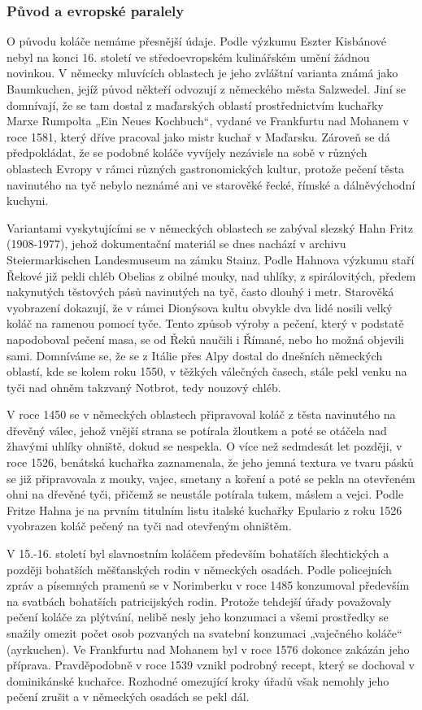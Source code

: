 \subsubsection{Původ a evropské
paralely}\label{250319-1326}

O původu koláče nemáme přesnější údaje. Podle výzkumu Eszter Kisbánové
nebyl na konci 16. století ve středoevropském kulinářském umění žádnou
novinkou. V německy mluvících oblastech je jeho zvláštní varianta známá
jako Baumkuchen, jejíž původ někteří odvozují z německého města
Salzwedel. Jiní se domnívají, že se tam dostal z maďarských oblastí
prostřednictvím kuchařky Marxe Rumpolta „Ein Neues Kochbuch``, vydané ve
Frankfurtu nad Mohanem v roce 1581, který dříve pracoval jako mistr
kuchař v Maďarsku. Zároveň se dá předpokládat, že se podobné koláče
vyvíjely nezávisle na sobě v různých oblastech Evropy v rámci různých
gastronomických kultur, protože pečení těsta navinutého na tyč nebylo
neznámé ani ve starověké řecké, římské a dálněvýchodní kuchyni.

Variantami vyskytujícími se v německých oblastech se zabýval slezský
Hahn Fritz (1908-1977), jehož dokumentační materiál se dnes nachází v
archivu Steiermarkischen Landesmuseum na zámku Stainz. Podle Hahnova
výzkumu staří Řekové již pekli chléb Obelias z obilné mouky, nad uhlíky,
z spirálovitých, předem nakynutých těstových pásů navinutých na tyč,
často dlouhý i metr. Starověká vyobrazení dokazují, že v rámci Dionýsova
kultu obvykle dva lidé nosili velký koláč na ramenou pomocí tyče. Tento
způsob výroby a pečení, který v podstatě napodoboval pečení masa, se od
Řeků naučili i Římané, nebo ho možná objevili sami. Domníváme se, že se
z Itálie přes Alpy dostal do dnešních německých oblastí, kde se kolem
roku 1550, v těžkých válečných časech, stále pekl venku na tyči nad
ohněm takzvaný Notbrot, tedy nouzový chléb.

V roce 1450 se v německých oblastech připravoval koláč z těsta
navinutého na dřevěný válec, jehož vnější strana se potírala žloutkem a
poté se otáčela nad žhavými uhlíky ohniště, dokud se nespekla. O více
než sedmdesát let později, v roce 1526, benátská kuchařka zaznamenala,
že jeho jemná textura ve tvaru pásků se již připravovala z mouky, vajec,
smetany a koření a poté se pekla na otevřeném ohni na dřevěné tyči,
přičemž se neustále potírala tukem, máslem a vejci. Podle Fritze Hahna
je na prvním titulním listu italské kuchařky Epulario z roku 1526
vyobrazen koláč pečený na tyči nad otevřeným ohništěm.

V 15.-16. století byl slavnostním koláčem především bohatších
šlechtických a později bohatších měšťanských rodin v německých osadách.
Podle policejních zpráv a písemných pramenů se v Norimberku v roce 1485
konzumoval především na svatbách bohatších patricijských rodin. Protože
tehdejší úřady považovaly pečení koláče za plýtvání, nelibě nesly jeho
konzumaci a všemi prostředky se snažily omezit počet osob pozvaných na
svatební konzumaci „vaječného koláče`` (ayrkuchen). Ve Frankfurtu nad
Mohanem byl v roce 1576 dokonce zakázán jeho příprava. Pravděpodobně v
roce 1539 vznikl podrobný recept, který se dochoval v dominikánské
kuchařce. Rozhodné omezující kroky úřadů však nemohly jeho pečení zrušit
a v německých osadách se pekl dál.


